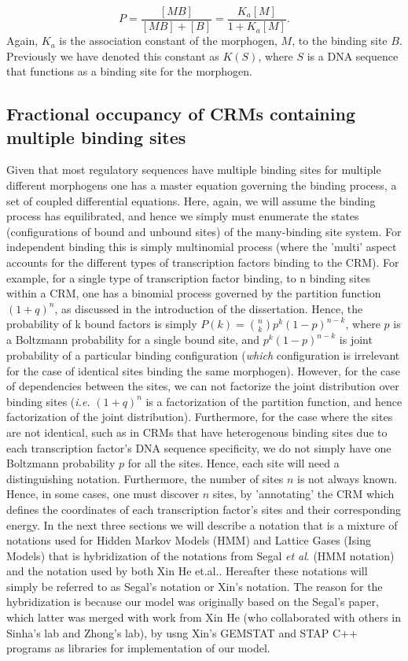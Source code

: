 \begin{equation}\label{}
    P =\frac{[MB]}{[MB] + [B]} = \frac{K_{a}[M]}{1+K_{a}[M]}.
\end{equation}
Again, $K_a$ is the association constant of the morphogen, $M$, to the binding site $B$.  Previously we have denoted this constant as $K(S)$, where $S$ is a DNA sequence that functions as a binding site for the morphogen. 

\subsection{Fractional occupancy of CRMs containing multiple binding sites }


Given that most regulatory sequences have multiple binding sites for multiple different morphogens one has a master equation governing the binding process, a set of coupled differential equations.  Here, again, we will assume the binding process has equilibrated, and hence we simply must enumerate the states (configurations of bound and unbound sites) of the many-binding site system.  For independent binding this is simply multinomial process (where the 'multi' aspect accounts for the different types of transcription factors binding to the CRM).  For example, for a single type of transcription factor binding, to n binding sites within a CRM, one has a binomial process governed by the partition function $(1+q)^n$, as discussed in the introduction of the dissertation.  Hence, the probability of k bound factors is simply $P(k) =  {n \choose k}p^k(1-p)^{n-k}$, where $p$ is a Boltzmann probability for a single bound site, and $p^k(1-p)^{n-k}$ is joint probability of a particular binding configuration (\emph{which} configuration is irrelevant for the case of identical sites binding the same morphogen).  However, for the case of dependencies between the sites, we can not factorize the joint distribution over binding sites (\textit{i.e.} $(1+q)^n$ is a factorization of the partition function, and hence factorization of the joint distribution).  Furthermore, for the case where the sites are not identical, such as in CRMs that have heterogenous binding sites due to each transcription factor's DNA sequence specificity, we do not simply have one Boltzmann probability $p$ for all the sites.  Hence, each site will need a distinguishing notation.  Furthermore, the number of sites $n$ is not always known.  Hence, in some cases, one must discover $n$ sites, by 'annotating' the CRM which defines the coordinates of each transcription factor's sites and their corresponding energy.  In the next three sections we will describe a notation that is a mixture of notations used for Hidden Markov Models (HMM) and Lattice Gases (Ising Models) that is hybridization of the notations from Segal \textit{et al}.\cite{pmid18172436} (HMM notation) and the notation used by both Xin He et.al.\cite{pmid20862354}\cite{pmid19956545}.  Hereafter these notations will simply be referred to as Segal's notation or Xin's notation.  The reason for the hybridization is because our model was originally based on the Segal's paper, which latter was merged with work from Xin He (who collaborated with others in Sinha's lab and Zhong's lab), by usng Xin's GEMSTAT and STAP C++ programs as libraries for implementation of our model.

